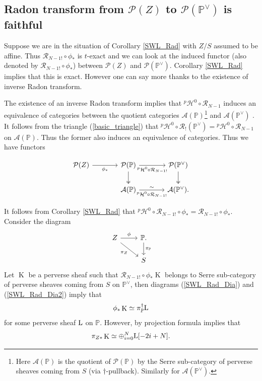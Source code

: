 \documentclass[12pt, reqno]{amsart}
\theoremstyle{plain}
\theoremstyle{definition}
\theoremstyle{definition}
\newcommand{\bbP}{{\mathbb P}}
\newcommand{\cA}{{\mathcal A}}
\newcommand{\cP}{{\mathcal P}}
\newcommand{\cR}{{\mathcal R}}
\newcommand{\cpH}{{^p\mathcal{H}}}
\DeclareMathOperator{\KK}{K}
\begin{document}
\subsection{Radon transform from $\cP(Z)$ to $\cP(\bbP^{\vee})$ is faithful}\label{inverse_Affine}Suppose we are in the situation of Corollary \ref{SWL_Rad} with $Z/S$ assumed to be affine. Thus $\cR_{N-1!} \circ \phi_*$ is $t$-exact and we can look at the induced functor (also denoted by $\cR_{N-1!} \circ \phi_*$) between $\cP(Z)$ and $\cP(\bbP^{\vee})$. Corollary \ref{SWL_Rad} implies that this is exact. However one can say more thanks to the existence of inverse Radon transform.

The existence of an inverse Radon transform implies that $\cpH^0 \circ \cR_{N-1}$ induces an equivalence of categories between the quotient categories $\cA(\bbP)$\footnote{Here $\cA(\bbP)$ is the quotient of $\cP(\bbP)$ by the Serre sub-category of perverse sheaves coming from $S$ (via $\dagger$-pullback). Similarly for $\cA(\bbP^{\vee})$.} and $\cA(\bbP^{\vee})$ \cite[Proposition 5.7]{Lau}. It follows from the triangle (\ref{basic_triangle}) that $\cpH^0 \circ \cR_!(\bbP^{\vee})=\cpH^0 \circ \cR_{N-1}$ on $\cA(\bbP)$. Thus the former also induces an equivalence of categories. Thus we have functors 

\begin{equation}\label{SWL_Rad_Dia}
    \begin{tikzcd}[column sep=large]
        \cP(Z) \arrow[r,"\phi_*"'] & \cP(\bbP) \arrow[r,"\cpH^0 \circ \cR_{N-1!}"'] \arrow[d,two heads] & \cP(\bbP^{\vee}) \arrow[d,two heads] \\
                                  &  \cA(\bbP) \arrow[r,"\sim","\cpH^0 \circ \cR_{N-1!}"'] & \cA(\bbP^{\vee}).
    \end{tikzcd}
\end{equation}

It follows from Corollary \ref{SWL_Rad} that $\cpH^0 \circ \cR_{N-1!} \circ \phi_*= \cR_{N-1!} \circ \phi_*$. Consider the diagram
\begin{equation}\label{SWL_Rad_Dia2}
  \begin{tikzcd}
      Z \arrow[r,"\phi"] \arrow[dr,"\pi_Z"'] & \bbP \arrow[d,"\pi_{\bbP}"]. \\
                          & S
  \end{tikzcd} 
\end{equation}
Let $\KK$ be a perverse sheaf such that $\cR_{N-1!} \circ \phi_*\KK$ belongs to Serre sub-category of perverse sheaves coming from $S$ on $\bbP^{\vee}$, then diagrams (\ref{SWL_Rad_Dia}) and (\ref{SWL_Rad_Dia2}) imply that 
\[
\phi_*\KK \simeq \pi_{\bbP}^{\dagger}\textup{L}
\]
\noindent for some perverse sheaf $\textup{L}$ on $\bbP$. However, by projection formula implies that 
\[
\pi_{Z*}\KK \simeq \oplus_{i=0}^{N}\textup{L}[-2i+N].
\]
\end{document}
